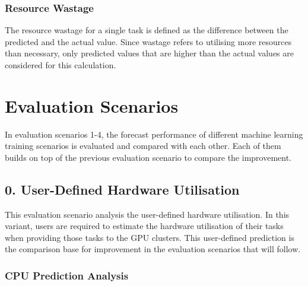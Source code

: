 
    \subsubsection{Resource Wastage}
    \label{sec:resource-wastage-metric-evaluation}

      The resource wastage for a single task is defined as the difference between the predicted and the actual value. Since wastage refers to utilising more resources than necessary, only predicted values that are higher than the actual values are considered for this calculation.

\section{Evaluation Scenarios}
\label{sec:evaluation-scenarios}

    In evaluation scenarios 1-4, the forecast performance of different machine learning training scenarios is evaluated and compared with each other. Each of them builds on top of the previous evaluation scenario to compare the improvement.

  \subsection*{0. User-Defined Hardware Utilisation}
  \label{sec:user-defined-hardware-utilisation}

      This evaluation scenario analysis the user-defined hardware utilisation. 
      In this variant, users are required to estimate the hardware utilisation of their tasks when providing those tasks to the GPU clusters.
      This user-defined prediction is the comparison base for improvement in the evaluation scenarios that will follow.

      \subsubsection{CPU Prediction Analysis}
      \label{sec:user-defined-cpu-prediction-analysis}

